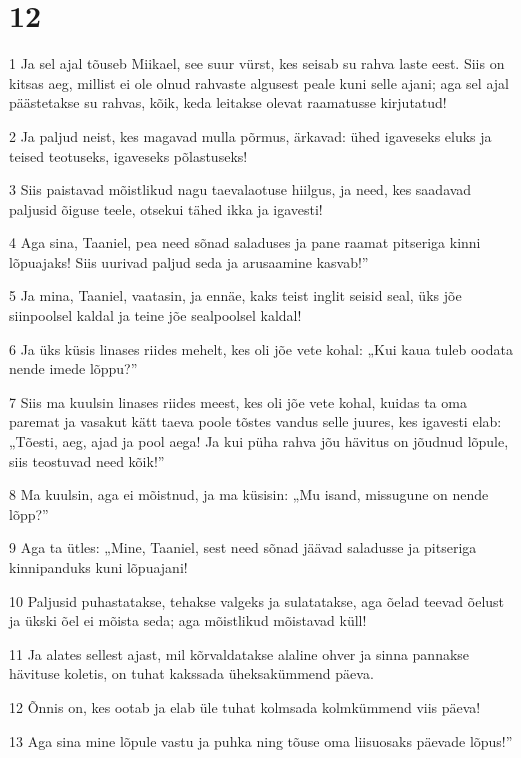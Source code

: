 \chapter{12}

\par 1 Ja sel ajal tõuseb Miikael, see suur vürst, kes seisab su rahva laste eest. Siis on kitsas aeg, millist ei ole olnud rahvaste algusest peale kuni selle ajani; aga sel ajal päästetakse su rahvas, kõik, keda leitakse olevat raamatusse kirjutatud!
\par 2 Ja paljud neist, kes magavad mulla põrmus, ärkavad: ühed igaveseks eluks ja teised teotuseks, igaveseks põlastuseks!
\par 3 Siis paistavad mõistlikud nagu taevalaotuse hiilgus, ja need, kes saadavad paljusid õiguse teele, otsekui tähed ikka ja igavesti!
\par 4 Aga sina, Taaniel, pea need sõnad saladuses ja pane raamat pitseriga kinni lõpuajaks! Siis uurivad paljud seda ja arusaamine kasvab!”
\par 5 Ja mina, Taaniel, vaatasin, ja ennäe, kaks teist inglit seisid seal, üks jõe siinpoolsel kaldal ja teine jõe sealpoolsel kaldal!
\par 6 Ja üks küsis linases riides mehelt, kes oli jõe vete kohal: „Kui kaua tuleb oodata nende imede lõppu?”
\par 7 Siis ma kuulsin linases riides meest, kes oli jõe vete kohal, kuidas ta oma paremat ja vasakut kätt taeva poole tõstes vandus selle juures, kes igavesti elab: „Tõesti, aeg, ajad ja pool aega! Ja kui püha rahva jõu hävitus on jõudnud lõpule, siis teostuvad need kõik!”
\par 8 Ma kuulsin, aga ei mõistnud, ja ma küsisin: „Mu isand, missugune on nende lõpp?”
\par 9 Aga ta ütles: „Mine, Taaniel, sest need sõnad jäävad saladusse ja pitseriga kinnipanduks kuni lõpuajani!
\par 10 Paljusid puhastatakse, tehakse valgeks ja sulatatakse, aga õelad teevad õelust ja ükski õel ei mõista seda; aga mõistlikud mõistavad küll!
\par 11 Ja alates sellest ajast, mil kõrvaldatakse alaline ohver ja sinna pannakse hävituse koletis, on tuhat kakssada üheksakümmend päeva.
\par 12 Õnnis on, kes ootab ja elab üle tuhat kolmsada kolmkümmend viis päeva!
\par 13 Aga sina mine lõpule vastu ja puhka ning tõuse oma liisuosaks päevade lõpus!”

